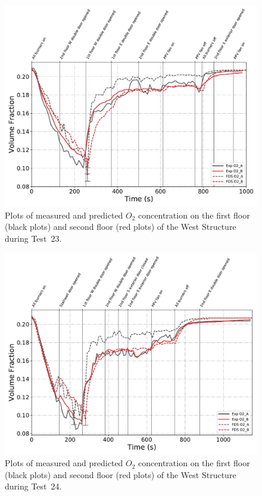 \begin{figure}[!h]
	\centering
	\includegraphics[width=\columnwidth]{Figures/Plots/Validation/Gas_Concentration/Test_23_O2}
	\caption[Plots of measured and predicted $O_2$ concentration during Test~23.]{Plots of measured and predicted $O_2$ concentration on the first floor (black plots) and second floor (red plots) of the West Structure during Test~23.}
	\label{fig:Test23_O2}
\end{figure}

\begin{figure}[!h]
	\centering
	\includegraphics[width=\columnwidth]{Figures/Plots/Validation/Gas_Concentration/Test_24_O2}
	\caption[Plots of measured and predicted $O_2$ concentration during Test~24.]{Plots of measured and predicted $O_2$ concentration on the first floor (black plots) and second floor (red plots) of the West Structure during Test~24.}
	\label{fig:Test24_O2}
\end{figure}


